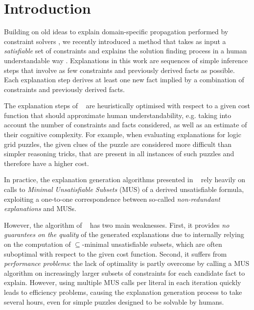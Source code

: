 \documentclass[twoside,11pt]{article}
\newcommand\citet[1]{\citeauthor{#1}~\citeyear{#1}}
\begin{document}
\section{Introduction}
\label{sec:introduction}

Building on old ideas to explain domain-specific propagation performed by constraint solvers \cite{sqalli1996inference,freuder2001explanation}, we recently introduced a method that takes as input a \emph{satisfiable} set of constraints
and explains the solution finding process in a human understandable way  . 
Explanations in this work are sequences of simple inference steps that involve as few constraints and previously derived facts as possible. 
Each explanation step derives at least one new fact implied by a combination of constraints and previously derived facts.

The explanation steps of \citet{ecai/BogaertsGCG20} are heuristically optimised with respect to a given cost function that should approximate human understandability, e.g. taking into account the number of constraints and facts considered, as well as an estimate of their cognitive complexity.
For example, when evaluating explanations for logic grid puzzles, the given clues of the puzzle are considered more difficult than simpler reasoning tricks, that are present in all instances of such puzzles and therefore have a higher cost.

In practice, the explanation generation algorithms presented in \citet{ecai/BogaertsGCG20} rely heavily on calls to \emph{Minimal Unsatisfiable Subsets} (MUS) \cite{marques2010minimal} of a derived unsatisfiable formula, exploiting a one-to-one correspondence between so-called \emph{non-redundant explanations} and MUSs. 

However, the algorithm of \citet{ecai/BogaertsGCG20} has two main weaknesses.
First, it provides \emph{no guarantees on the quality} of the generated explanations due to internally relying on the computation of $\subseteq$-minimal unsatisfiable subsets, which are often suboptimal with respect to the given cost function. 
Second, it suffers from \emph{performance problems}: the lack of optimality is partly overcome by calling a MUS algorithm on increasingly larger subsets of constraints for each candidate fact to explain.
However, using multiple MUS calls per literal in each iteration quickly leads to efficiency problems, causing the explanation generation process to take several hours, even for simple puzzles designed to be solvable by humans.
\end{document}

